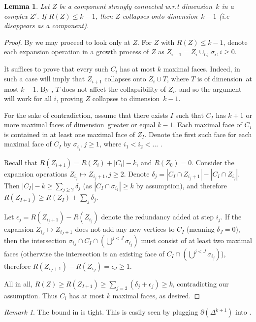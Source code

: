 \documentclass{article}
\newcommand{\prs}[1]{\left( #1 \right)}
\theoremstyle{plain}
\newtheorem{lemma}[theorem]{Lemma}
\theoremstyle{definition}
\theoremstyle{remark}
\newtheorem{remark}[theorem]{Remark}
\newcommand{\di}{dimension}
\begin{document}
\begin{lemma}\label{lem:redunColapse}
    Let $Z$ be a component strongly connected w.r.t \di \ $k$ in a complex $Z'$. If $R(Z)\le k-1$, then $Z$ collapses onto \di \ $k-1$ (i.e disappears as a component).
\end{lemma}
\begin{proof}
By  we may proceed to look only at $Z$.
For $Z$ with $R(Z)\le k-1$, denote each expansion operation in a growth process of $Z$ as $ Z_{i+1}=Z_i\cup _{C_i}\sigma_{i}, i\ge 0$.

It suffices to prove that every such $C_i$ has at most $k$ maximal faces. Indeed, in such a case  will imply that $Z_{i+1}$ collapses onto $Z_i\cup T$, where $T$ is of \di \ at most $k-1$.
By , $T$ does not affect the collapsibility of $Z_i$, and so the argument will work for all $i$, proving $Z$ collapses to \di \ $k-1$.
 
 For the sake of contradiction, assume that there exists $I$ such that $C_I$ has $k+1$ or more maximal faces of \di\ greater or equal $k-1$. Each maximal face of $C_I$ is contained in at least one maximal face of $Z_I$. Denote the first such face for each maximal face of $C_I$ by $\sigma_{i_j}, j\ge 1$, where  $i_1 < i_2 < \dots$ .

 Recall that $R(Z_{i+1})=R(Z_i)+|C_i|-k$, and $R(Z_0)=0$. Consider the expansion operations $Z_{i_j}\mapsto Z_{i_j+1}, j\ge 2$. Denote $\delta_j=|C_I\cap Z_{i_j+1}|-|C_I\cap Z_{i_j}|$.
 Then $|C_I|-k\ge \sum_{j\ge 2}\delta_j$ (as $|C_I\cap \sigma_{i_1}|\ge k$ by assumption), and therefore $R(Z_{I+1})\ge R(Z_I)+\sum_j\delta_j$.

Let $\epsilon_j = R(Z_{i_j+1}) - R(Z_{i_j})$ denote the redundancy added at step $i_j$. If the expansion $Z_{i_J} \mapsto Z_{i_J+1}$ does not add any new vertices to $C_I$ (meaning $\delta_J = 0$), then the intersection $\sigma_{i_J} \cap C_I \cap \prs{\bigcup^{j<J} \sigma_{i_j}}$ must consist of at least two maximal faces (otherwise the intersection is an existing face of $ C_I\cap \prs{\bigcup^{j<J} \sigma_{i_j}}$), therefore $R(Z_{i_J+1})-R(Z_{i_J})=\epsilon_J\ge 1$.

 All in all, $R(Z)\ge R(Z_{I+1})\ge \sum_{j=2}(\delta_j+\epsilon_j)\ge k$, contradicting our assumption.
 Thus $C_i$ has at most $k$ maximal faces, as desired.
 \end{proof}

\begin{remark}
    The bound in  is tight. This is easily seen by plugging $\partial(\Delta^{k+1})$ into .
\end{remark}
\end{document}
